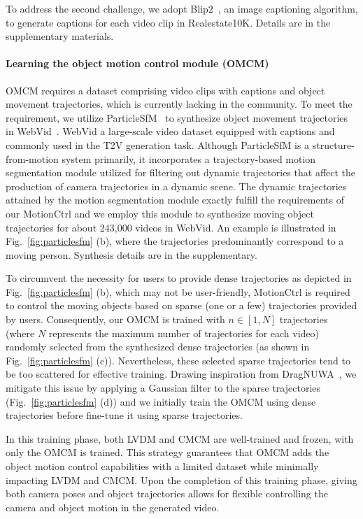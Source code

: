 \documentclass[sigconf]{acmart}
\begin{document}
To address the second challenge, we adopt Blip2~\cite{blip2}, an image captioning algorithm, to generate captions for each video clip in Realestate10K. Details are in the supplementary materials.


\paragraph{Learning the object motion control module (OMCM)} OMCM requires a dataset comprising video clips with captions and object movement trajectories, which is currently lacking in the community. To meet the requirement, we utilize ParticleSfM~\cite{zhao2022particlesfm} to synthesize object movement trajectories in WebVid~\cite{bain2021frozen}. WebVid a large-scale video dataset equipped with captions and commonly used in the T2V generation task. Although ParticleSfM is a structure-from-motion system primarily, it incorporates a trajectory-based motion segmentation module utilized for filtering out dynamic trajectories that affect the production of camera trajectories in a dynamic scene. The dynamic trajectories attained by the motion segmentation module exactly fulfill the requirements of our MotionCtrl and we employ this module to synthesize moving object trajectories for about 243,000 videos in WebVid. An example is illustrated in Fig.~\ref{fig:particlesfm} (b), where the trajectories predominantly correspond to a moving person. Synthesis details are in the supplementary.

To circumvent the necessity for users to provide dense trajectories as depicted in Fig.~\ref{fig:particlesfm} (b), which may not be user-friendly, MotionCtrl is required to control the moving objects based on sparse (one or a few) trajectories provided by users. Consequently, our OMCM is trained with $n \in [1, N]$ trajectories (where $N$ represents the maximum number of trajectories for each video) randomly selected from the synthesized dense trajectories (as shown in Fig.~\ref{fig:particlesfm} (c)).
%
Nevertheless, these selected sparse trajectories tend to be too scattered for effective training. Drawing inspiration from DragNUWA~\cite{yin2023dragnuwa}, we mitigate this issue by applying a Gaussian filter to the sparse trajectories (Fig.~\ref{fig:particlesfm} (d)) and we initially train the OMCM using dense trajectories before fine-tune it using sparse trajectories.

In this training phase, both LVDM and CMCM are well-trained and frozen, with only the OMCM is trained. This strategy guarantees that OMCM adds the object motion control capabilities with a limited dataset while minimally impacting LVDM and CMCM. 
Upon the completion of this training phase, giving both camera poses and object trajectories allows for flexible controlling the camera and object motion in the generated video.
\end{document}

